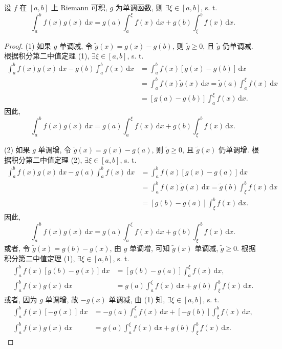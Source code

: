 \begin{theorem}[一般的积分第二中值定理]\label{thm:6.2.8}
设 $f$ 在 $[a,b]$ 上 Riemann 可积, $g$ 为单调函数, 则 $\exists\xi\in[a,b]$, s. t.
\[
\int_{a}^{b}f(x)g(x)\,\mathrm{d}x=g(a)\int_{a}^{\xi}f(x)\,\mathrm{d}x+g(b)\int_{\xi}^{b}f(x)\,\mathrm{d}x.
\]
\end{theorem}

\begin{proof}
(1) 如果 $g$ 单调减, 令 $\widetilde{g}(x)=g(x)-g(b)$, 则 $\widetilde{g}\geqslant 0$, 且 $\widetilde{g}$ 仍单调减. 根据积分第二中值定理 (1), $\exists\xi\in[a,b]$, s. t.
\begin{align*}
\int_{a}^{b}f(x)g(x)\,\mathrm{d}x-g(b)\int_{a}^{b}f(x)\,\mathrm{d}x&=\int_{a}^{b}f(x)[g(x)-g(b)]\,\mathrm{d}x\\
&=\int_{a}^{b}f(x)\widetilde{g}(x)\,\mathrm{d}x=\widetilde{g}(a)\int_{a}^{\xi}f(x)\,\mathrm{d}x\\
&=[g(a)-g(b)]\int_{a}^{\xi}f(x)\,\mathrm{d}x.
\end{align*}
因此,
\[
\int_{a}^{b}f(x)g(x)\,\mathrm{d}x=g(a)\int_{a}^{\xi}f(x)\,\mathrm{d}x+g(b)\int_{\xi}^{b}f(x)\,\mathrm{d}x.
\]

(2) 如果 $g$ 单调增, 令 $\widetilde{g}(x)=g(x)-g(a)$, 则 $\widetilde{g}\geqslant 0$, 且 $\widetilde{g}(x)$ 仍单调增. 根据积分第二中值定理 (2), $\exists\xi\in[a,b]$, s. t.
\begin{align*}
\int_{a}^{b}f(x)g(x)\,\mathrm{d}x-g(a)\int_{a}^{b}f(x)\,\mathrm{d}x&=\int_{a}^{b}f(x)[g(x)-g(a)]\,\mathrm{d}x\\
&=\int_{a}^{b}f(x)\widetilde{g}(x)\,\mathrm{d}x=\widetilde{g}(b)\int_{\xi}^{b}f(x)\,\mathrm{d}x\\
&=[g(b)-g(a)]\int_{\xi}^{b}f(x)\,\mathrm{d}x.
\end{align*}
因此,
\[
\int_{a}^{b}f(x)g(x)\,\mathrm{d}x=g(a)\int_{a}^{\xi}f(x)\,\mathrm{d}x+g(b)\int_{\xi}^{b}f(x)\,\mathrm{d}x.
\]
或者, 令 $\widetilde{g}(x)=g(b)-g(x)$, 由 $g$ 单调增, 可知 $\widetilde{g}(x)$ 单调减, $\widetilde{g}\geqslant 0$. 根据积分第二中值定理 (1), $\exists\xi\in[a,b]$, s. t.
\begin{align*}
\int_{a}^{b}f(x)[g(b)-g(x)]\,\mathrm{d}x&=[g(b)-g(a)]\int_{a}^{\xi}f(x)\,\mathrm{d}x,\\
\int_{a}^{b}f(x)g(x)\,\mathrm{d}x&=g(a)\int_{a}^{\xi}f(x)\,\mathrm{d}x+g(b)\int_{\xi}^{b}f(x)\,\mathrm{d}x.
\end{align*}
或者, 因为 $g$ 单调增, 故 $-g(x)$ 单调减, 由 (1) 知, $\exists\xi\in[a,b]$, s. t.
\begin{align*}
\int_{a}^{b}f(x)[-g(x)]\,\mathrm{d}x&=-g(a)\int_{a}^{\xi}f(x)\,\mathrm{d}x+[-g(b)]\int_{\xi}^{b}f(x)\,\mathrm{d}x,\\
\int_{a}^{b}f(x)g(x)\,\mathrm{d}x&=g(a)\int_{a}^{\xi}f(x)\,\mathrm{d}x+g(b)\int_{\xi}^{b}f(x)\,\mathrm{d}x.
\end{align*}
\end{proof}

